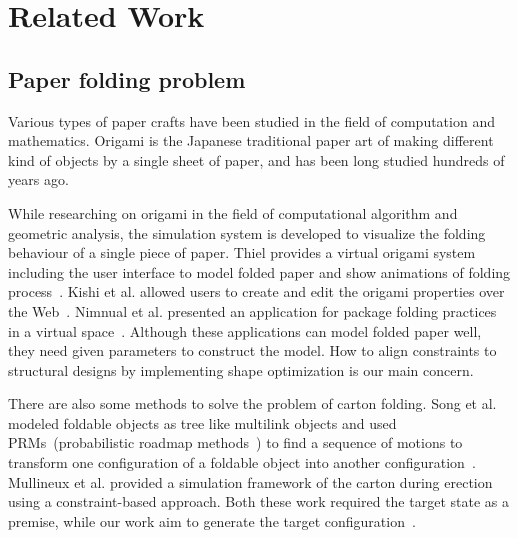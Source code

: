 \section{Related Work}\label{sec:relatedwork}
\subsection{Paper folding problem}
Various types of paper crafts have been studied in the field of computation and mathematics. Origami is the Japanese traditional paper art of making different kind of objects by a single sheet of paper, and has been long studied hundreds of years ago\cite{KANADE1980279}.

While researching on origami in the field of computational algorithm and geometric analysis, the simulation system is developed to visualize the folding behaviour of a single piece of paper. Thiel provides a virtual origami system including the user interface to model folded paper and show animations of folding process~\cite{Thiel1998}. Kishi et al. allowed users to create and edit the origami properties over the Web~\cite{Kishi:1998:OFP:786112.786279}. Nimnual et al. presented an application for package folding practices in a virtual space~\cite{Nimnual2007Virtual}. Although these applications can model folded paper well, they need given parameters to construct the model. How to align constraints to structural designs by implementing shape optimization is our main concern.

There are also some methods to solve the problem of carton folding. 
Song et al. modeled foldable objects as tree like multilink objects and used PRMs~(probabilistic roadmap methods~\cite{Kavraki:1994:PRP:891758}) to find a sequence of motions to transform one configuration of a foldable object into another configuration~\cite{Song:2000:MPA:892954}. 
Mullineux et al. provided a simulation framework of the carton during erection using a constraint-based approach. Both these work required the target state as a premise, while our work aim to generate the target configuration~\cite{Mullineux:2010:CSC:1739328.1739673}.

